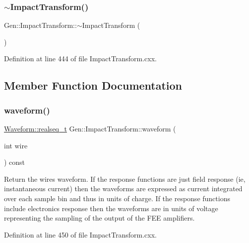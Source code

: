 \subsubsection{\texorpdfstring{$\sim$\+Impact\+Transform()}{~ImpactTransform()}}
{\footnotesize\ttfamily Gen\+::\+Impact\+Transform\+::$\sim$\+Impact\+Transform (\begin{DoxyParamCaption}{ }\end{DoxyParamCaption})\hspace{0.3cm}{\ttfamily [virtual]}}



Definition at line 444 of file Impact\+Transform.\+cxx.



\subsection{Member Function Documentation}
\mbox{\label{class_wire_cell_1_1_gen_1_1_impact_transform_ad65b81bab03b2a6f8836782c732556bc}} 
\subsubsection{\texorpdfstring{waveform()}{waveform()}}
{\footnotesize\ttfamily \hyperlink{namespace_wire_cell_1_1_waveform_a479175e541c8545e87cd8063b74b6956}{Waveform\+::realseq\+\_\+t} Gen\+::\+Impact\+Transform\+::waveform (\begin{DoxyParamCaption}\item[{int}]{wire }\end{DoxyParamCaption}) const}

Return the wire\textquotesingle{}s waveform. If the response functions are just field response (ie, instantaneous current) then the waveforms are expressed as current integrated over each sample bin and thus in units of charge. If the response functions include electronics response then the waveforms are in units of voltage representing the sampling of the output of the F\+EE amplifiers. 

Definition at line 450 of file Impact\+Transform.\+cxx.

